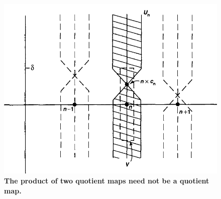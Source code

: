 \documentclass[11pt]{article}
\begin{document}
\begin{itemize}
\begin{example}
\begin{figure}
\begin{minipage}[t]{1\linewidth}
  \centering
  \centerline{\includegraphics[scale = 0.3]{non_hausdorff_quotient_product.png}}
\end{minipage}
\caption{\footnotesize{\textbf{The product of two quotient maps need not be a quotient map. \citep{munkres2000topology}}}}
\label{fig: non_hausdorff_quotient_product}
\end{figure}
\end{example}
\end{itemize}
\end{document}
